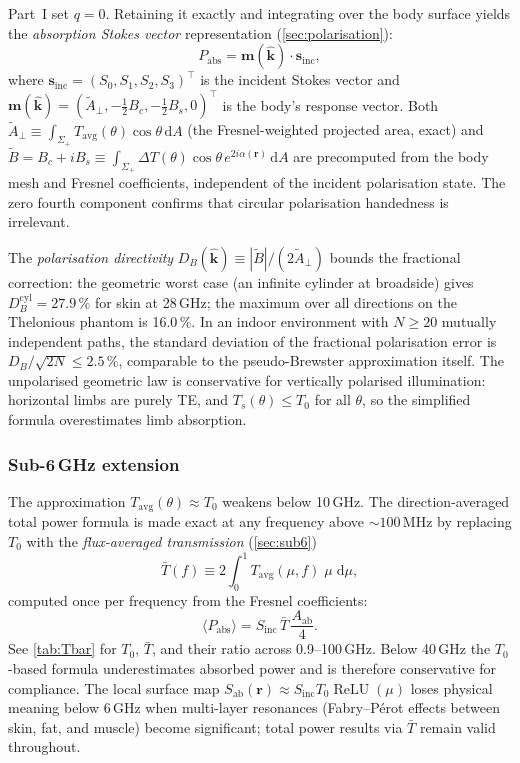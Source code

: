 \documentclass[11pt,a4paper]{article}
\theoremstyle{definition}      %
\newcommand{\khat}{\hat{\bm{k}}}
\newcommand{\rr}{\mathbf{r}}
\newcommand{\Sinc}{S_{\mathrm{inc}}}
\newcommand{\Sab}{S_{\mathrm{ab}}}
\newcommand{\Tavg}{T_{\mathrm{avg}}}
\newcommand{\Aab}{A_{\mathrm{ab}}}
\DeclareMathOperator{\ReLU}{ReLU}
\newcommand{\Tbar}{\bar{T}}
\newcommand{\diff}{\mathrm{d}}        %
\begin{document}
Part~I set $q=0$.  Retaining it exactly and integrating over the body
surface yields the \emph{absorption Stokes vector} representation
(\cref{sec:polarisation}):
\begin{equation}\label{sum:eq:Pabs-Stokes}
  \boxed{P_{\mathrm{abs}} = \mathbf{m}(\khat)\cdot\mathbf{s}_{\mathrm{inc}},}
\end{equation}
where $\mathbf{s}_{\mathrm{inc}}=(S_0,S_1,S_2,S_3)^\top$ is the incident
Stokes vector and $\mathbf{m}(\khat)=(\tilde{A}_\perp,
-\tfrac{1}{2}B_c,-\tfrac{1}{2}B_s,0)^\top$ is the body's response vector.
Both $\tilde{A}_\perp\equiv\int_{\Sigma_+}\Tavg(\theta)\cos\theta\,\diff A$
(the Fresnel-weighted projected area, exact) and
$\tilde{B}=B_c+iB_s\equiv\int_{\Sigma_+}\Delta T(\theta)\cos\theta\,
e^{2i\alpha(\rr)}\,\diff A$ are precomputed from the body mesh and Fresnel
coefficients, independent of the incident polarisation state.
The zero fourth component confirms that circular polarisation handedness
is irrelevant.

The \emph{polarisation directivity} $D_B(\khat)\equiv|\tilde{B}|/(2\tilde{A}_\perp)$
bounds the fractional correction: the geometric worst case (an infinite
cylinder at broadside) gives $D_B^{\mathrm{cyl}}=27.9\,\%$ for skin at
28\,GHz; the maximum over all directions on the Thelonious phantom is
16.0\,\%.
In an indoor environment with $N\ge20$ mutually independent paths, the
standard deviation of the fractional polarisation error is
$D_B/\sqrt{2N}\le2.5\,\%$, comparable to the pseudo-Brewster
approximation itself.
The unpolarised geometric law is conservative for vertically polarised
illumination: horizontal limbs are purely TE, and $T_s(\theta)\le T_0$
for all $\theta$, so the simplified formula overestimates limb absorption.

\subsubsection*{Sub-6\,GHz extension}

The approximation $\Tavg(\theta)\approx T_0$ weakens below 10\,GHz.
The direction-averaged total power formula is made exact at any
frequency above ${\sim}100$\,MHz by replacing $T_0$ with the
\emph{flux-averaged transmission} (\cref{sec:sub6})
\begin{equation}\label{sum:eq:Tbar}
  \Tbar(f) \equiv 2\int_0^1 \Tavg(\mu,f)\;\mu\;\diff\mu,
\end{equation}
computed once per frequency from the Fresnel coefficients:
\begin{equation}\label{sum:eq:Cauchy-exact}
  \boxed{\langle P_{\mathrm{abs}}\rangle = \Sinc\,\Tbar\,\frac{\Aab}{4}.}
\end{equation}
See \cref{tab:Tbar} for $T_0$, $\Tbar$, and their ratio across
0.9--100\,GHz.
Below 40\,GHz the $T_0$-based formula underestimates absorbed power
and is therefore conservative for compliance.
The local surface map $\Sab(\rr)\approx\Sinc T_0\ReLU(\mu)$ loses
physical meaning below 6\,GHz when multi-layer resonances
(Fabry--P\'{e}rot effects between skin, fat, and muscle) become
significant; total power results via $\Tbar$ remain valid throughout.
\end{document}
